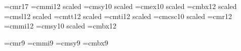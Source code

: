  
\ifx\tenpoint\undefined\let\loadedfrommacro=Y
         
         \let\loadedfrommacro=N\fi
 
\font\seventeenrm=cmr17
\font\seventeeni=cmmi12 scaled 
\font\seventeensy=cmsy10 scaled 
\font\seventeenex=cmex10 scaled 
\font\seventeenbf=cmbx12 scaled 
\font\seventeensl=cmsl12 scaled 
\font\seventeentt=cmtt12 scaled 
\font\seventeenit=cmti12 scaled 
\font\seventeencsc=cmcsc10 scaled 
\font\twelverm=cmr12
\font\twelvei=cmmi12
\font\twelvesy=cmsy10 scaled 
\font\twelvebf=cmbx12
 
\font\ninerm=cmr9
\font\ninei=cmmi9
\font\ninesy=cmsy9
\font\ninebf=cmbx9
 
\ifx\seventeenpoint\undefined
   \def\seventeenpoint{\def\rm{\fam0\seventeenrm}%
       \textfont0=\seventeenrm \scriptfont0=\twelverm \scriptscriptfont0=\ninerm
       \textfont1=\seventeeni  \scriptfont1=\twelvei  \scriptscriptfont1=\ninei
       \textfont2=\seventeensy \scriptfont2=\twelvesy \scriptscriptfont2=\ninesy
       \textfont3=\seventeenex \scriptfont3=\seventeenex
                              \scriptscriptfont3=\seventeenex
       \textfont\itfam=\seventeenit  \def\it{\fam\itfam\seventeenit}%
       \textfont\slfam=\seventeensl  \def\sl{\fam\slfam\seventeensl}%
       \textfont\ttfam=\seventeentt  \def\tt{\fam\ttfam\seventeentt}%
       \textfont\bffam=\seventeenbf  \scriptfont\bffam=\twelvebf
        \scriptscriptfont\bffam=\ninebf  \def\bf{\fam\bffam\seventeenbf}%
       \textfont\scfam=\seventeencsc \def\sc{\fam\scfam\seventeencsc}%
       \normalbaselineskip=21pt
       \setbox\strutbox=\hbox{\vrule height17pt depth4pt width0pt}%
       \normalbaselines\rm}
   \fi
